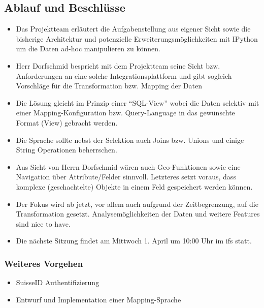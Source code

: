 \documentclass[class=scrbook,crop=false]{standalone}
\begin{document}
	\subsection*{Ablauf und Beschlüsse}
	\begin{itemize}
		\item Das Projektteam erläutert die Aufgabenstellung aus eigener Sicht sowie die bisherige Architektur und potenzielle Erweiterungsmöglichkeiten mit IPython um die Daten ad-hoc manipulieren zu können.
		\item Herr Dorfschmid bespricht mit dem Projektteam seine Sicht bzw. Anforderungen an eine solche Integrationsplattform und gibt sogleich Vorschläge für die Transformation bzw. Mapping der Daten
		\item Die Lösung gleicht im Prinzip einer ``SQL-View'' wobei die Daten selektiv mit einer Mapping-Konfiguration bzw. Query-Language in das gewünschte Format (View) gebracht werden.
		\item Die Sprache sollte nebst der Selektion auch Joins bzw. Unions und einige String Operationen beherrschen.
		\item Aus Sicht von Herrn Dorfschmid wären auch Geo-Funktionen sowie eine Navigation über Attribute/Felder sinnvoll. Letzteres setzt voraus, dass komplexe (geschachtelte) Objekte in einem Feld gespeichert werden können.
		\item Der Fokus wird ab jetzt, vor allem auch aufgrund der Zeitbegrenzung, auf die Transformation gesetzt. Analysemöglichkeiten der Daten und weitere Features sind nice to have.
		\item Die nächste Sitzung findet am Mittwoch 1. April um 10:00 Uhr im \acs{ifs} statt.
	\end{itemize}
	
	\subsubsection*{Weiteres Vorgehen}
	\begin{itemize}
		\item SuisseID Authentifizierung
		\item Entwurf und Implementation einer Mapping-Sprache
	\end{itemize}
\end{document}
